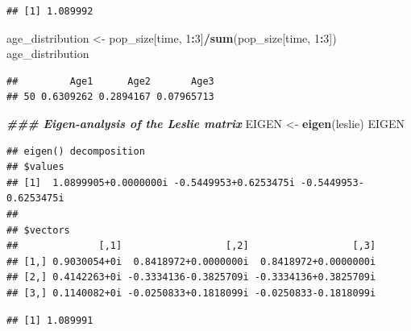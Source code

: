 \documentclass[
]{book}
\newenvironment{Shaded}{\begin{snugshade}}{\end{snugshade}}
\newcommand{\CommentTok}[1]{\textcolor[rgb]{0.56,0.35,0.01}{\textit{#1}}}
\newcommand{\DecValTok}[1]{\textcolor[rgb]{0.00,0.00,0.81}{#1}}
\newcommand{\DocumentationTok}[1]{\textcolor[rgb]{0.56,0.35,0.01}{\textbf{\textit{#1}}}}
\newcommand{\FunctionTok}[1]{\textcolor[rgb]{0.13,0.29,0.53}{\textbf{#1}}}
\newcommand{\NormalTok}[1]{#1}
\newcommand{\OtherTok}[1]{\textcolor[rgb]{0.56,0.35,0.01}{#1}}
\newcommand{\SpecialCharTok}[1]{\textcolor[rgb]{0.81,0.36,0.00}{\textbf{#1}}}
\begin{document}
\begin{verbatim}
## [1] 1.089992
\end{verbatim}

\begin{Shaded}
\begin{Highlighting}[]
\NormalTok{age\_distribution }\OtherTok{\textless{}{-}}\NormalTok{ pop\_size[time, }\DecValTok{1}\SpecialCharTok{:}\DecValTok{3}\NormalTok{]}\SpecialCharTok{/}\FunctionTok{sum}\NormalTok{(pop\_size[time, }\DecValTok{1}\SpecialCharTok{:}\DecValTok{3}\NormalTok{])}
\NormalTok{age\_distribution}
\end{Highlighting}
\end{Shaded}

\begin{verbatim}
##         Age1      Age2       Age3
## 50 0.6309262 0.2894167 0.07965713
\end{verbatim}

\begin{Shaded}
\begin{Highlighting}[]
\DocumentationTok{\#\#\# Eigen{-}analysis of the Leslie matrix}
\NormalTok{EIGEN }\OtherTok{\textless{}{-}} \FunctionTok{eigen}\NormalTok{(leslie)}
\NormalTok{EIGEN}
\end{Highlighting}
\end{Shaded}

\begin{verbatim}
## eigen() decomposition
## $values
## [1]  1.0899905+0.0000000i -0.5449953+0.6253475i -0.5449953-0.6253475i
## 
## $vectors
##              [,1]                  [,2]                  [,3]
## [1,] 0.9030054+0i  0.8418972+0.0000000i  0.8418972+0.0000000i
## [2,] 0.4142263+0i -0.3334136-0.3825709i -0.3334136+0.3825709i
## [3,] 0.1140082+0i -0.0250833+0.1818099i -0.0250833-0.1818099i
\end{verbatim}

\begin{Shaded}
\end{Shaded}

\begin{verbatim}
## [1] 1.089991
\end{verbatim}

\begin{Shaded}
\end{Shaded}
\end{document}
